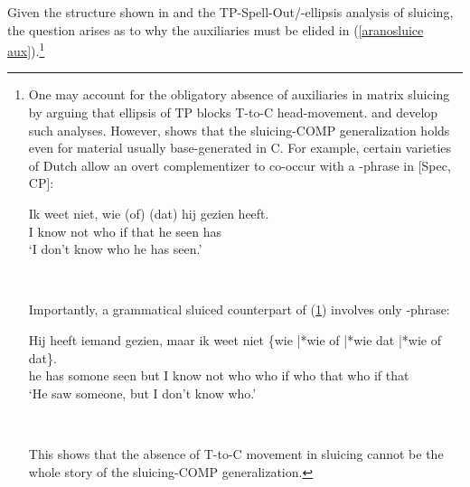 \documentclass[output=paper]{langscibook}
\begin{document}
\noindent Given the structure shown in  and the TP-Spell-Out/-ellipsis analysis of sluicing, the question arises as to why the auxiliaries must be elided in (\ref{aranosluice aux}).\footnote{One may account for the obligatory absence of auxiliaries in matrix sluicing by arguing that ellipsis of TP blocks T-to-C head-movement. \citet{Lasnik1999On-Feature-Stre} and \citet{Boeckx2001Head-ing-toward} develop such analyses. However, \citet{Merchant2001The-syntax-of-s} shows that the sluicing-COMP generalization holds even for material usually base-generated in C. For example, certain varieties of Dutch allow an overt complementizer to co-occur with a \wh-phrase in [Spec, CP]:

\ea \label{aranosou Dutch}
\gll Ik weet niet, wie \textup{(}of\textup{)} \textup{(}dat\textup{)} hij gezien heeft.   \\
 I know not who \phantom{(}if \phantom{(}that he seen has          \\  
\glt `I don't know who he has seen.'

\citep[74]{Merchant2001The-syntax-of-s}  \\ 
\z
{} 

\noindent Importantly, a grammatical sluiced counterpart of (\ref{aranosou Dutch}) involves only \wh-phrase: 

\ea 
\gll Hij heeft iemand gezien, maar ik weet niet \textup{\{}wie \textup{|*}wie of \textup{|*}wie dat \textup{|*}wie of dat\textup{\}}.   \\
he has somone seen but I know not \phantom{\{}who \phantom{|*}who if \phantom{|*}who that \phantom{|*}who if that \\  
\glt `He saw someone, but I don’t know who.'

\citep[75]{Merchant2001The-syntax-of-s} \\ \jambox*{\upshape[Dutch]}
\z 

\noindent This shows that the absence of T-to-C movement in sluicing cannot be the whole story of the sluicing-COMP generalization.}
\end{document}
